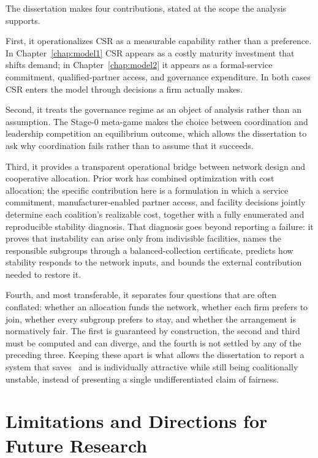 The dissertation makes four contributions, stated at the scope the analysis supports.

First, it operationalizes CSR as a measurable capability rather than a preference. In Chapter~\ref{chap:model1} CSR appears as a costly maturity investment that shifts demand; in Chapter~\ref{chap:model2} it appears as a formal-service commitment, qualified-partner access, and governance expenditure. In both cases CSR enters the model through decisions a firm actually makes.

Second, it treats the governance regime as an object of analysis rather than an assumption. The Stage-0 meta-game makes the choice between coordination and leadership competition an equilibrium outcome, which allows the dissertation to ask why coordination fails rather than to assume that it succeeds.

Third, it provides a transparent operational bridge between network design and cooperative allocation. Prior work has combined optimization with cost allocation; the specific contribution here is a formulation in which a service commitment, manufacturer-enabled partner access, and facility decisions jointly determine each coalition's realizable cost, together with a fully enumerated and reproducible stability diagnosis. That diagnosis goes beyond reporting a failure: it proves that instability can arise only from indivisible facilities, names the responsible subgroups through a balanced-collection certificate, predicts how stability responds to the network inputs, and bounds the external contribution needed to restore it.

Fourth, and most transferable, it separates four questions that are often conflated: whether an allocation funds the network, whether each firm prefers to join, whether every subgroup prefers to stay, and whether the arrangement is normatively fair. The first is guaranteed by construction, the second and third must be computed and can diverge, and the fourth is not settled by any of the preceding three. Keeping these apart is what allows the dissertation to report a system that saves \ChFourSavingsPercent\ and is individually attractive while still being coalitionally unstable, instead of presenting a single undifferentiated claim of fairness.

\section{Limitations and Directions for Future Research}
\label{sec:ch5_limitations}

